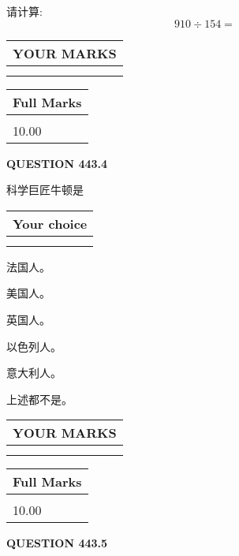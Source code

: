 \documentclass{ctexart}
\begin{document}
  
 
请计算:
\begin{equation}
910  \div    %
154 = \nonumber
\end{equation}
 

 

 
  
\vspace{0.2in}
  
\noindent\begin{tabular}{|l|}
\hline
 YOUR MARKS  \\
\hline
 \\ 
 \\ 
\hline
\end{tabular}
\hspace{0.05in} \begin{tabular}{|l|}
\hline
 Full Marks  \\
\hline
 \\ 
10.00 \\
\hline
\end{tabular}
{\textbf{\Large{QUESTION
443.4 
}}}
  
  
科学巨匠牛顿是
  
  
\noindent\hspace{3.0in} \begin{tabular}{|l|}
\hline
Your choice \\
\hline
 \\ 
 \\ 
\hline
\end{tabular}
  
  
 
 
法国人。
 
 
美国人。
 
 
英国人。
 
 
以色列人。
 
 
意大利人。
 
 
 上述都不是。
 
 
  
\vspace{0.2in}
  
\noindent\begin{tabular}{|l|}
\hline
 YOUR MARKS  \\
\hline
 \\ 
 \\ 
\hline
\end{tabular}
\hspace{0.05in} \begin{tabular}{|l|}
\hline
 Full Marks  \\
\hline
 \\ 
10.00 \\
\hline
\end{tabular}
{\textbf{\Large{QUESTION
443.5 
}}}
  
\end{document}
